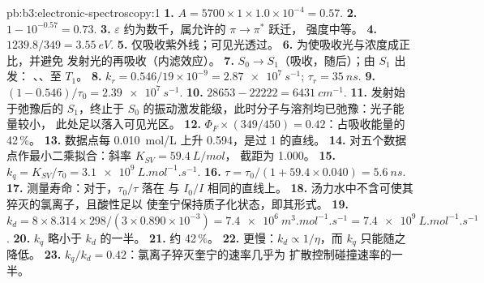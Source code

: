 \begin{solution}{pb:b3:electronic-spectroscopy:1}
\textbf{1.} $A = 5700 \times 1 \times 1.0\times10^{-4} = 0.57$.
\textbf{2.} $1 - 10^{-0.57} = 0.73$.
\textbf{3.} $\varepsilon$ 约为数千，属允许的 $\pi\to\pi^*$ 跃迁，
强度中等。
\textbf{4.} $1239.8/349 = \qty{3.55}{eV}$.
\textbf{5.} 仅吸收紫外线；可见光透过。
\textbf{6.} 为使吸收光与浓度成正比，并避免
发射光的再吸收（内滤效应）。
\textbf{7.} $S_0 \to S_1$（吸收，随后）；由 $S_1$ 出发：
、、至 $T_1$。
\textbf{8.} $k_r = 0.546/19 \times 10^{-9} = \qty{2.87e7}{s^{-1}}$; $\tau_r = \qty{35}{ns}$.
\textbf{9.} $(1 - 0.546)/\tau_0 = \qty{2.39e7}{s^{-1}}$.
\textbf{10.} $28653 - 22222 = \qty{6431}{cm^{-1}}$.
\textbf{11.} 发射始于弛豫后的 $S_1$，终止于
$S_0$ 的振动激发能级，此时分子与溶剂均已弛豫：光子能量较小，
此处足以落入可见光区。
\textbf{12.} $\Phi_F \times (349/450) = 0.42$：占吸收能量的 42\,\%。
\textbf{13.} 数据点每 \qty{0.010}{mol/L} 上升 0.594，是过 1 的直线。
\textbf{14.} 对五个数据点作最小二乘拟合：斜率 $K_{SV} = \qty{59.4}{L/mol}$，
截距为 1.000。
\textbf{15.} $k_q = K_{SV}/\tau_0 = \qty{3.1e9}{L.mol^{-1}.s^{-1}}$.
\textbf{16.} $\tau = \tau_0/(1 + 59.4 \times 0.040) = \qty{5.6}{ns}$.
\textbf{17.} 测量寿命：对于，$\tau_0/\tau$ 落在
与 $I_0/I$ 相同的直线上。
\textbf{18.} 汤力水中不含可使其猝灭的氯离子，且酸性足以
使奎宁保持质子化状态，即其形式。
\textbf{19.} $k_d = 8 \times 8.314 \times 298/(3 \times 0.890\times10^{-3}) =
\qty{7.4e6}{m^3.mol^{-1}.s^{-1}} = \qty{7.4e9}{L.mol^{-1}.s^{-1}}$.
\textbf{20.} $k_q$ 略小于 $k_d$ 的一半。
\textbf{21.} 约 42\,\%。
\textbf{22.} 更慢：$k_d \propto 1/\eta$，而 $k_q$ 只能随之降低。
\textbf{23.} \textbf{$k_q/k_d = 0.42$}：氯离子猝灭奎宁的速率几乎为
扩散控制碰撞速率的一半。
\end{solution}
